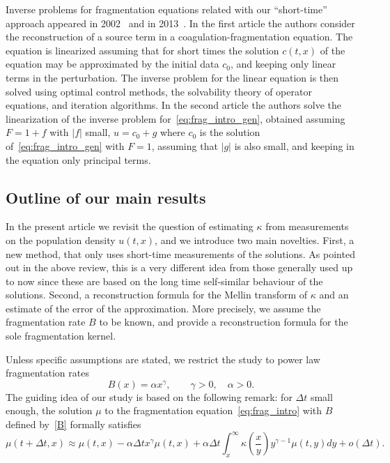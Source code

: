 \documentclass[10pt]{amsart}
\theoremstyle{definition}\newtheorem{defi}[theo]{Definition}\newtheorem{rema}[theo]{Remark}\newtheorem{exam}[theo]{Example}\newtheorem{exem}[theo]{Example}\newtheorem{nota}[theo]{Notation}
\newcommand*\dst{\displaystyle}
\renewcommand*\a{\alpha}
\begin{document}
Inverse problems for fragmentation equations related with our ``short-time'' approach appeared in 2002~\cite{AgoshkovDubovski} and in 2013~\cite{Alomari}. In the first article the authors consider the reconstruction of a source term in a coagulation-fragmentation equation. The equation is linearized assuming that for short times the solution $c(t, x)$ of the equation may be approximated by the initial data $c_0$, and keeping only linear terms in the perturbation. The inverse problem for the linear equation is then solved using optimal control methods, the solvability theory of operator equations, and iteration algorithms. In the second article the authors solve the linearization of the inverse problem for~\eqref{eq:frag_intro_gen}, obtained assuming $F=1+f$ with $|f|$ small, $u=c_0+g$ where $c_0$ is the solution of~\eqref{eq:frag_intro_gen} with $F=1$, assuming that $|g|$ is also small, and keeping in the equation only principal terms.




\subsection{Outline of our main results}

In the present article we revisit the question of estimating $\kappa$ from measurements on the population density $u(t,x)$, and we introduce two main novelties. First, a new method, that only uses short-time measurements of the solutions. As pointed out in the above review, this is a very different idea from those generally used up to now since these are based on the long time self-similar behaviour of the solutions. Second, a reconstruction formula for the Mellin transform of $\kappa$ and an estimate of the error of the approximation. More precisely, we assume the fragmentation rate $B$ to be known, and provide a reconstruction formula for the sole fragmentation kernel.

Unless specific assumptions are stated, we restrict the study to power law fragmentation rates
\begin{equation}\label{B}
B(x)= \a x^{\gamma}, \qquad \gamma>0,\quad \alpha > 0.
\end{equation}
 The guiding idea of our study is based on the following remark: for $\Delta t$ small enough, the solution $\mu$ to the fragmentation equation~\eqref{eq:frag_intro} with $B$ defined by~\eqref{B} formally satisfies
\begin{equation}\label{eq:approx1}
\mu (t+\Delta t,x)\approx \mu (t,x) -\a \Delta t x^{\gamma}\mu (t,x)+ \alpha \Delta t \dst\int_{x}^{\infty}\kappa\left(\dfrac{x}{y} \right)y^{\gamma-1} \mu (t,y)dy+ o(\Delta t).
\end{equation}
\end{document}
